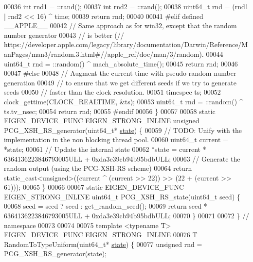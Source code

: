\begin{DoxyCode}
00036   \textcolor{keywordtype}{int} rnd1 = ::rand();
00037   \textcolor{keywordtype}{int} rnd2 = ::rand();
00038   uint64\_t rnd = (rnd1 | rnd2 << 16) ^ time;
00039   \textcolor{keywordflow}{return} rnd;
00040 
00041 \textcolor{preprocessor}{#elif defined \_\_APPLE\_\_}
00042   \textcolor{comment}{// Same approach as for win32, except that the random number generator}
00043   \textcolor{comment}{// is better (//
       https://developer.apple.com/legacy/library/documentation/Darwin/Reference/ManPages/man3/random.3.html#//apple\_ref/doc/man/3/random).}
00044   uint64\_t rnd = ::random() ^ mach\_absolute\_time();
00045   \textcolor{keywordflow}{return} rnd;
00046 
00047 \textcolor{preprocessor}{#else}
00048   \textcolor{comment}{// Augment the current time with pseudo random number generation}
00049   \textcolor{comment}{// to ensure that we get different seeds if we try to generate seeds}
00050   \textcolor{comment}{// faster than the clock resolution.}
00051   timespec ts;
00052   clock\_gettime(CLOCK\_REALTIME, &ts);
00053   uint64\_t rnd = ::random() ^ ts.tv\_nsec;
00054   \textcolor{keywordflow}{return} rnd;
00055 \textcolor{preprocessor}{#endif}
00056 \}
00057 
00058 \textcolor{keyword}{static} EIGEN\_DEVICE\_FUNC EIGEN\_STRONG\_INLINE \textcolor{keywordtype}{unsigned} PCG\_XSH\_RS\_generator(uint64\_t* 
      \hyperlink{structstate}{state}) \{
00059   \textcolor{comment}{// TODO: Unify with the implementation in the non blocking thread pool.}
00060   uint64\_t current = *state;
00061   \textcolor{comment}{// Update the internal state}
00062   *state = current * 6364136223846793005ULL + 0xda3e39cb94b95bdbULL;
00063   \textcolor{comment}{// Generate the random output (using the PCG-XSH-RS scheme)}
00064   \textcolor{keywordflow}{return} \textcolor{keyword}{static\_cast<}\textcolor{keywordtype}{unsigned}\textcolor{keyword}{>}((current ^ (current >> 22)) >> (22 + (current >> 61)));
00065 \}
00066 
00067 \textcolor{keyword}{static} EIGEN\_DEVICE\_FUNC EIGEN\_STRONG\_INLINE uint64\_t PCG\_XSH\_RS\_state(uint64\_t seed) \{
00068   seed = seed ? seed : get\_random\_seed();
00069   \textcolor{keywordflow}{return} seed * 6364136223846793005ULL + 0xda3e39cb94b95bdbULL;
00070 \}
00071 
00072 \}  \textcolor{comment}{// namespace}
00073 
00074 
00075 \textcolor{keyword}{template} <\textcolor{keyword}{typename} T> EIGEN\_DEVICE\_FUNC EIGEN\_STRONG\_INLINE
00076 \hyperlink{group___sparse_core___module_class_eigen_1_1_triplet}{T} RandomToTypeUniform(uint64\_t* \hyperlink{structstate}{state}) \{
00077   \textcolor{keywordtype}{unsigned} rnd = PCG\_XSH\_RS\_generator(state);

\end{DoxyCode}
